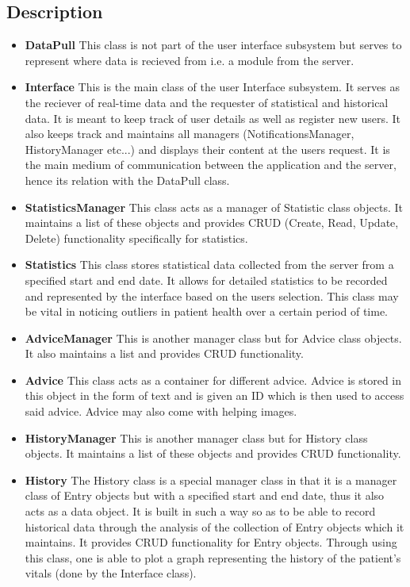 \subsection{Description}
\begin{itemize}
	\item \textbf{DataPull}
	This class is not part of the user interface subsystem but serves to represent where data is recieved from i.e. a module from the server. 
	\item \textbf{Interface}
	This is the main class of the user Interface subsystem. It serves as the reciever of real-time data and the requester of statistical and historical data. It is meant to keep track of user details as well as register new users. It also keeps track and maintains all managers (NotificationsManager, HistoryManager etc...) and displays their content at the users request. It is the main medium of communication between the application and the server, hence its relation with the DataPull class. 
	\item \textbf{StatisticsManager}
	This class acts as a  manager of Statistic class objects. It maintains a list of these objects and provides CRUD (Create, Read, Update, Delete) functionality specifically for statistics. 
	\item \textbf{Statistics}
	This class stores statistical data collected from the server from a specified start and end date. It allows for detailed statistics to be recorded and represented by the interface based on the users selection. This class may be vital in noticing outliers in patient health over a certain period of time. 
	\item \textbf{AdviceManager}
	This is another manager class but for Advice class objects. It also maintains a list and provides CRUD functionality. 
	\item \textbf{Advice}
	This class acts as a container for different advice. Advice is stored in this object in the form of text and is given an ID which is then used to access said advice. Advice may also come with helping images.
  	\item \textbf{HistoryManager}
	This is another manager class but for History class objects. It maintains a list of these objects and provides CRUD functionality. 
  	\item \textbf{History}
	The History class is a special manager class in that it is a manager class of Entry objects but with a specified start and end date, thus it also acts as a data object. It is built in such a way so as to be able to record historical data through the analysis of the collection of Entry objects which it maintains. It provides CRUD functionality for Entry objects. Through using this class, one is able to plot a graph representing the history of the patient's vitals (done by the Interface class). 

\end{itemize}
